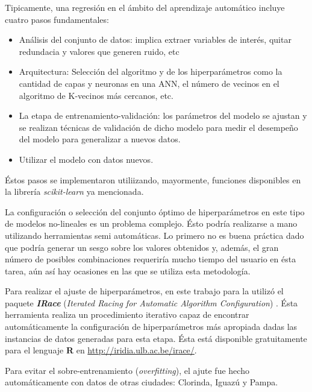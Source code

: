     \par Tipicamente, una regresión en el ámbito del aprendizaje automático
      incluye cuatro pasos fundamentales:
      \begin{itemize}
        \item Análisis del conjunto de datos: implica extraer variables de interés, quitar redundacia y valores que generen
              ruido, etc
        \item Arquitectura: Selección del algoritmo y de los hiperparámetros como
              la cantidad de capas y neuronas en una ANN, el número de vecinos en
              el algoritmo de K-vecinos más cercanos, etc.
        \item La etapa de entrenamiento-validación: los parámetros del modelo
              se ajustan y se realizan técnicas de validación de dicho modelo para
              medir el desempeño del modelo para generalizar a nuevos datos.
        \item Utilizar el modelo con datos nuevos.
      \end{itemize}
      Éstos pasos se implementaron utiliizando, mayormente, funciones disponibles
      en la librería \textit{scikit-learn} ya mencionada.

    \par La configuración o selección del conjunto óptimo de hiperparámetros
      en este tipo de modelos no-lineales es un problema complejo. Ésto
      podría realizarse a mano utilizando herramientas semi automáticas. Lo primero
      no es buena práctica dado que podría generar un sesgo sobre los valores
      obtenidos y, además, el gran número de posibles combinaciones requeriría
      mucho tiempo del usuario en ésta tarea, aún así hay ocasiones en las
      que se utiliza esta metodología.

    \par Para realizar el ajuste de hiperparámetros, en este trabajo para la
      utilizó el paquete \textbf{\textit{IRace}}
      (\textit{Iterated Racing for Automatic Algorithm Configuration}) \cite{irace}.
      Ésta herramienta realiza un procedimiento iterativo capaz de encontrar
      automáticamente la configuración de hiperparámetros más apropiada
      dadas las instancias de datos generadas para esta etapa.
      Ésta está disponible gratuitamente para el lenguaje \textbf{R} en
      \url{http://iridia.ulb.ac.be/irace/}.

    \par Para evitar el sobre-entrenamiento (\textit{overfitting}), el ajute
      fue hecho automáticamente con datos de otras ciudades: Clorinda, Iguazú
      y Pampa.


